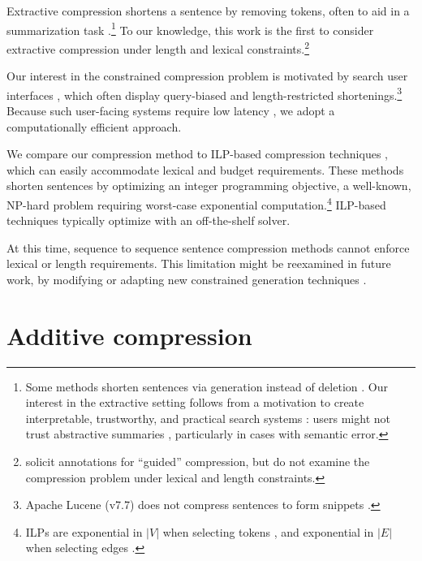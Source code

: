 \documentclass[11pt,a4paper]{article}
\begin{document}
Extractive compression \cite{Knight2000StatisticsBasedS,clarke2008global,filippova2015sentence,Wang2017CanSH} shortens a sentence by removing tokens, often to aid in a summarization task \cite{Knight2000StatisticsBasedS,almeida2013fast,P16-1188}.\footnote{Some methods shorten sentences via generation instead of deletion \cite{rush2015neural,mallinson18}. Our interest in the extractive setting follows from a motivation to create interpretable,  trustworthy, and practical search systems \cite{Chuang2012InterpretationAT}: users might not trust abstractive summaries \cite{Zhang:2018:MSG:3290265.3274465}, particularly in cases with semantic error.} To our knowledge, this work is the first to consider extractive compression under length and lexical constraints.\footnote{\citet{Li2013DocumentSV} solicit annotations for ``guided'' compression, but do not examine the compression problem under lexical and length constraints.}

Our interest in the constrained compression problem is motivated by search user interfaces \cite{hearst2009search}, which often display query-biased \cite{tombros1998advantages} and length-restricted shortenings.\footnote{Apache Lucene {\small (v7.7)} does not compress sentences to form snippets \cite{lucene}.} 
Because such user-facing systems require low latency \cite{Nielsen,heerschei,Liu2014TheEO}, we adopt a computationally efficient approach. 

We compare our compression method to ILP-based compression techniques \cite{clarke2008global,filippova2008dependency,filippova2013overcoming,Wang2017CanSH}, which can easily accommodate lexical and budget requirements. These methods shorten sentences by optimizing an integer programming objective, a well-known, NP-hard problem \cite{clarke2008global} requiring worst-case exponential computation.\footnote{ILPs are exponential in $|V|$ when selecting tokens \cite{clarke2008global}, and exponential in $|E|$ when selecting edges \cite{filippova2013overcoming}.} ILP-based techniques typically optimize with an off-the-shelf solver. 

At this time, sequence to sequence sentence compression methods \cite{filippova2015sentence}  cannot enforce lexical or length requirements. This limitation might be reexamined in future work, by modifying or adapting new constrained generation techniques \cite{D16-1140,N18-1119,D18-1443,aaimh}.

\section{Additive compression}\label{s:system}
\end{document}
